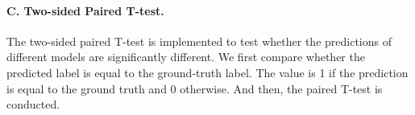 \paragraph{C. Two-sided Paired T-test.}
The two-sided paired T-test is implemented to test whether the predictions of different models are significantly different. We first compare whether the predicted label is equal to the ground-truth label. The value is 1 if the prediction is equal to the ground truth and 0 otherwise. And then, the paired T-test is conducted. 
